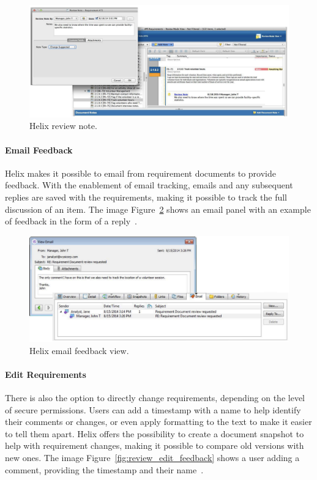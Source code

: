 \begin{figure}[htbp]
    \centering
    \includegraphics[width=\linewidth]{images/review-notes}
    \caption{Helix review note.}
    \label{fig:review_notes}
\end{figure}


\paragraph{Email Feedback}
Helix makes it possible to email from requirement documents to 
provide feedback.
With the enablement of email tracking,
emails and any subsequent replies are saved with the requirements, 
making it possible to track the full discussion of an item.
The image Figure~\ref{fig:review_email} shows an email panel with an example of feedback in the form of a reply~\cite{perforce_2024}.

\begin{figure}[htbp]
    \centering
    \includegraphics[width=\linewidth]{images/email-feedback}
    \caption{Helix email feedback view.}
    \label{fig:review_email}
\end{figure}

\paragraph{Edit Requirements}
There is also the option to directly change requirements, 
depending on the level of secure permissions.
Users can add a
timestamp with a name to help identify their comments or changes, 
or even apply formatting to the text to make it easier to tell them apart. 
Helix offers the possibility to create a document snapshot to help with requirement changes, 
making it possible to compare old versions with new ones.
The image Figure~\ref{fig:review_edit_feedback} shows a user adding a comment, providing  the timestamp and their name~\cite{perforce_2024}.

